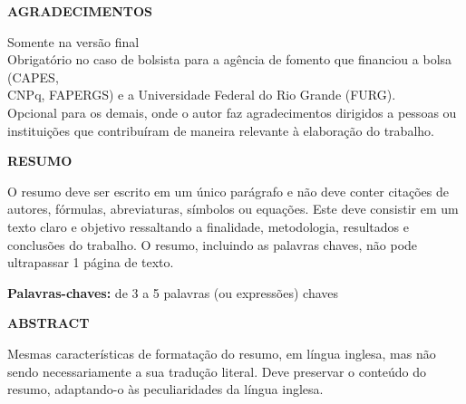 \documentclass[a4paper,12pt,oneside]{article}
\numberwithin{equation}{section}
\begin{document}
\newpage
\thispagestyle{empty}
\justify

\begin{center}
\Large{\textbf{AGRADECIMENTOS}}\vspace*{1cm}
\end{center}

Somente na versão final\\


Obrigatório no caso de bolsista para a agência de fomento que financiou a bolsa (CAPES,\\
CNPq, FAPERGS) e a Universidade Federal do Rio Grande (FURG).\\


Opcional para os demais, onde o autor faz agradecimentos dirigidos a pessoas ou\\
instituições que contribuíram de maneira relevante à elaboração do trabalho.\\



\newpage
\thispagestyle{empty}
\begin{center}
\Large{\textbf{RESUMO}}\vspace*{1cm}
\end{center}

O resumo deve ser escrito em um único parágrafo e não deve conter citações de autores,
fórmulas, abreviaturas, símbolos ou equações. Este deve consistir em um texto claro e objetivo
ressaltando a finalidade, metodologia, resultados e conclusões do trabalho. O resumo, incluindo as
palavras chaves, não pode ultrapassar 1 página de texto. 

\vspace*{1cm}
\textbf{Palavras-chaves:} de 3 a 5 palavras (ou expressões) chaves


\newpage
\thispagestyle{empty}

\begin{center}
\Large{\textbf{ABSTRACT}}\vspace*{1cm}
\end{center}

Mesmas características de formatação do resumo, em língua inglesa, mas não sendo
necessariamente a sua tradução literal. Deve preservar o conteúdo do resumo, adaptando-o às
peculiaridades da língua inglesa.
\end{document}
